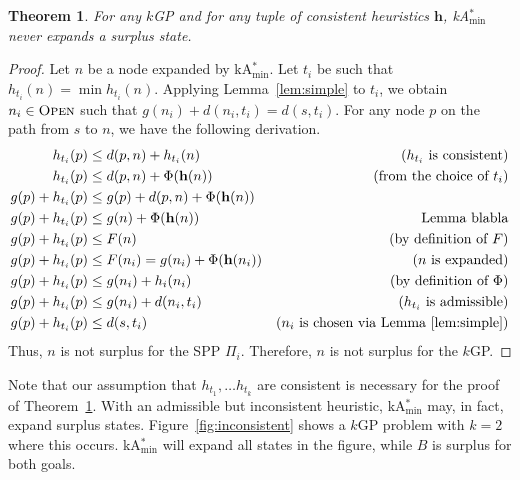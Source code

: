 \documentclass[twoside,11pt]{article}
\newtheorem{theorem}{Theorem}
\newcommand{\kgs}{$k$GP\xspace}
\newcommand{\kastarvar}[1]{\textup{kA}$^*_{#1}$\xspace}
\newcommand{\kastarmin}{\kastarvar{\min}}
\newcommand{\open}{\textsc{Open}\xspace}
\newcommand{\vect}[1]{\mathbf{#1}}
\begin{document}
\begin{theorem}
	\label{the:kastarmin-surplus}
	For any \kgs and for any tuple of consistent heuristics $\vect{h}$, \kastarmin never expands a surplus state.
\end{theorem}
\begin{proof}
	Let $n$ be a node expanded by \kastarmin.
	Let $t_i$ be such that $h_{t_i}(n) = \min h_{t_i}(n)$.
	Applying Lemma~\ref{lem:simple} to $t_i$, we obtain $n_i \in \open$ such that $g(n_i) + d(n_i, t_i) = d(s, t_i)$.
	For any node $p$ on the path from $s$ to $n$, we have the following derivation.
	\begin{align}
	h_{t_i}(p)        & \leq d(p, n) + h_{t_i}(n)         & \text{($h_{t_i}$ is consistent)}\\
	h_{t_i}(p)        & \leq d(p, n) + \Phi(\vect{h}(n))         & \text{(from the choice of $t_i$)}\\
	g(p) + h_{t_i}(p) & \leq g(p) + d(p, n) + \Phi(\vect{h}(n)) & \text{}\\
	g(p) + h_{t_i}(p) & \leq g(n) + \Phi(\vect{h}(n))          & \text{Lemma blabla}\\
	g(p) + h_{t_i}(p) & \leq F(n)         & \text{(by definition of $F$)}\\
	g(p) + h_{t_i}(p) & \leq F(n_i) = g(n_i) + \Phi(\vect{h}(n_i))      & \text{($n$ is expanded)}\\
	g(p) + h_{t_i}(p) & \leq g(n_i) + h_i(n_i) & \text{(by definition of $\Phi$)}\\
	g(p) + h_{t_i}(p) & \leq g(n_i) + d(n_i, t_i) & \text{($h_{t_i}$ is admissible)}\\
	g(p) + h_{t_i}(p) & \leq d(s, t_i) & \text{($n_i$ is chosen via Lemma~\ref{lem:simple})}
	\label{eq:nosurplus}
	\end{align}
	Thus, $n$ is not surplus for the SPP $\Pi_i$.
	Therefore, $n$ is not surplus for the \kgs.
\end{proof}

Note that our assumption that $h_{t_1}, \ldots h_{t_k}$ are consistent is necessary for the proof of Theorem~\ref{the:kastarmin-surplus}.
With an admissible but inconsistent heuristic, \kastarmin may, in fact, expand surplus states.
Figure~\ref{fig:inconsistent} shows a \kgs problem with $k = 2$ where this occurs.
\kastarmin will expand all states in the figure, while $B$ is surplus for both goals.
\end{document}
